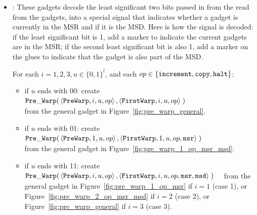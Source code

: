 \begin{itemize}

    \item {\prewarp}: These gadgets decode the least significant two bits passed in from
                      the read from the {\cread} gadgets, into a special signal that indicates whether a gadget
                      is currently in the MSR and if it is the MSD. Here is how the signal is decoded: if the least
                      significant bit is 1, add a marker to indicate the current gadgets are in the MSR; if the second least
                      significant bit is also 1, add a marker on the glues to indicate that the gadget is also part
                      of the MSD.

    For each $i = 1,2,3, u \in \{0, 1\}^l$, and each $op \in \{ {\tt increment}, {\tt copy}, {\tt halt} \}$:
    \begin{itemize}

        \item if $u$ ends with 00:
        create
        $\begin{aligned}[t]
            {\tt Pre\_Warp}(& \left\langle {\tt PreWarp},   i, u, op \right\rangle,
                       \left\langle {\tt FirstWarp}, i, u, op \right\rangle \;)
        \end{aligned}$ \\ from the general gadget in Figure~\ref{fig:pre_warp_general}.

        \item if $u$ ends with 01:
        create
        $\begin{aligned}[t]
            {\tt Pre\_Warp}(& \left\langle {\tt PreWarp},   1, u, op            \right\rangle,
                       \left\langle {\tt FirstWarp}, 1, u, op, {\tt msr} \right\rangle \;)
        \end{aligned}$ \\ from the general gadget in Figure~\ref{fig:pre_warp_1_op_msr_msd}.


        \item if $u$ ends with 11:
        create
        $\begin{aligned}[t]
            {\tt Pre\_Warp}(& \left\langle {\tt PreWarp},   i, u, op                       \right\rangle,
                       \left\langle {\tt FirstWarp}, i, u, op, {\tt msr}, {\tt msd} \right\rangle \;)
        \end{aligned}$ from the general gadget in Figure~\ref{fig:pre_warp_1_op_msr} if $i = 1$ (case 1),
        or Figure~\ref{fig:pre_warp_2_op_msr_msd} if $i = 2$ (case 2), or Figure~\ref{fig:pre_warp_general} if $i = 3$ (case 3).
    \end{itemize}
    \vspace{.5cm}


\end{itemize}
